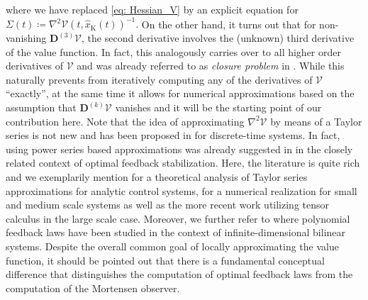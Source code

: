 \documentclass[11pt,reqno]{amsart}
\numberwithin{equation}{section}
\theoremstyle{plain}
\newcommand{\TenDeriv}[1]{\mathbf{D}^{(#1)}}
\begin{document}
where we have replaced \eqref{eq: Hessian_V} by an explicit equation for $\Sigma(t)\coloneqq\nabla^2 \mathcal{V}(t,\widehat{x}_{\mathrm{K}}(t))^{-1}.$ On the other hand, it turns out that for non-vanishing $\TenDeriv{3} \mathcal{V}$, the second derivative involves the (unknown) third derivative of the value function. In fact, this analogously carries over to all higher order derivatives of $\mathcal{V}$ and was already referred to as \emph{closure problem} in \cite{Mor68}. While this naturally prevents from iteratively computing any of the derivatives of $\mathcal{V}$ ``exactly'', at the same time it allows for numerical approximations based on the assumption that $\TenDeriv{k}\mathcal{V}$ vanishes and it will be the starting point of our contribution here.
Note that the idea of approximating $\nabla^2 \mathcal{V}$ by means of a Taylor series is not new and has been proposed in \cite{Kre15,Kre18} for discrete-time systems. In fact, using power series based approximations was already suggested in \cite{Alb61} in the closely related context of optimal feedback stabilization. Here, the literature is quite rich and we exemplarily mention \cite{Luk69} for a theoretical analysis of Taylor series approximations for analytic control systems, \cite{AguK14,KreAH13} for a numerical realization for small and medium scale systems as well as the more recent work \cite{BorZ21,BreKP18,Kraetal24,CorK25} utilizing tensor calculus in the large scale case. Moreover, we further refer to \cite{BreKP19} where polynomial feedback laws have been studied in the context of infinite-dimensional bilinear systems. Despite the overall common goal of locally approximating the value function, it should be pointed out that there is a fundamental conceptual difference that distinguishes the computation of optimal feedback laws from the computation of the Mortensen observer.
\end{document}
